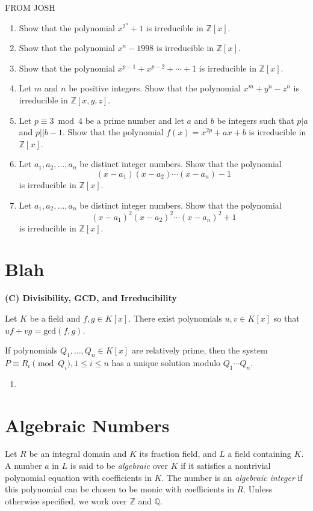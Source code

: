 FROM JOSH
\begin{enumerate}
\item Show that the polynomial $x^{2^n}+1$ is irreducible in $\mathbb
Z[x]$.
\item Show that the polynomial $x^n-1998$ is irreducible in $\mathbb
Z[x]$.
\item Show that the polynomial $x^{p-1}+x^{p-2}+\cdots+1$ is
irreducible in $\mathbb Z[x]$.
\item Let $m$ and $n$ be positive integers.  Show that the polynomial
$x^m+y^n-z^n$ is irreducible in $\mathbb Z[x,y,z]$.
\item Let $p\equiv 3\bmod 4$ be a prime number and let $a$ and $b$ be
integers such that $p | a$ and $p || b-1$.  Show that the polynomial
$f(x) = x^{2p} + ax+b$ is irreducible in $\mathbb Z[x]$.
\item Let $a_1,a_2,\ldots,a_n$ be distinct integer numbers.  Show that
the polynomial \[(x-a_1)(x-a_2)\cdots(x-a_n)-1\] is irreducible in
$\mathbb Z[x]$.
\item Let $a_1,a_2,\ldots,a_n$ be distinct integer numbers.  Show that
the polynomial \[(x-a_1)^2(x-a_2)^2\cdots(x-a_n)^2+1\] is irreducible
in $\mathbb Z[x]$.
\end{enumerate}

\section{Blah}
\noindent\textbf{(C) Divisibility, GCD, and Irreducibility}
\begin{thm}[B\'{e}zout]
Let $K$ be a field and $f,g\in K[x]$. There exist polynomials $u,v\in K[x]$ so that $uf+vg=\text{gcd}(f,g)$.
\end{thm}
\begin{thm}  If polynomials $Q_1,\ldots, Q_n\in K[x]$ are relatively prime, then the system $P\equiv R_i\pmod{Q_i}, 1\leq i\leq n$ has a unique solution modulo $Q_1\cdots Q_n$.
\end{thm}

\begin{enumerate}
\item
\end{enumerate}

\section{Algebraic Numbers}

Let $R$ be an integral domain and $K$ its fraction field, and $L$ a field containing $K$. 
A number $a$ in $L$ is said to be \emph{algebraic} over $K$ if it satisfies a nontrivial polynomial equation with coefficients in $K$. The number is an \emph{algebraic integer} if this polynomial can be chosen to be monic with coefficients in $R$. Unless otherwise specified, we work over $\mathbb{Z}$ and $\mathbb{Q}$.

